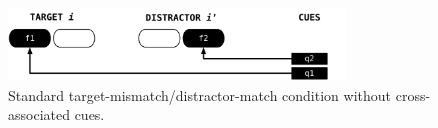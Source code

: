 \documentclass{cambridge7A}\usepackage[]{graphicx}\usepackage[]{color}
\begin{document}
\begin{figure}[htbp]
	\centering
	\includegraphics[width=0.80\textwidth]{figures/implFig1}
	\caption{Standard target-mismatch/distractor-match condition without cross-associated cues.}
	\label{fig:implFig1}
\end{figure}


\end{document}
